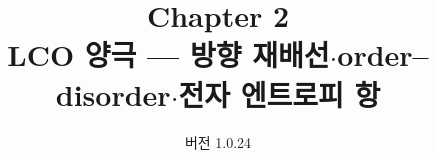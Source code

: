 

\renewcommand{\theequation}{2.\arabic{equation}}
\renewcommand{\thesection}{2.\arabic{section}}

\title{\textbf{\LARGE Chapter 2}\\[0.35em]\Large LCO 양극 --- 방향 재배선$\cdot$order--disorder$\cdot$전자 엔트로피 항}
\author{}
\date{\normalsize 버전 1.0.24}


\maketitle












